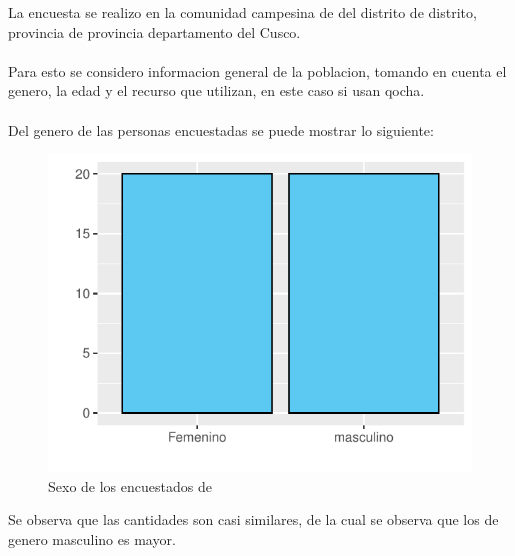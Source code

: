 \documentclass[12pt]{article}\usepackage[]{graphicx}\usepackage[]{xcolor}
\makeatletter
\def\maxwidth{ %
  \ifdim\Gin@nat@width>\linewidth
    \linewidth
  \else
    \Gin@nat@width
  \fi
}
\newenvironment{knitrout}{}{} %
\makeatother
\begin{document}

\tableofcontents
\newpage
\listoftables
\newpage
\listoffigures
\newpage
	La encuesta se realizo en la comunidad campesina de \comunidad\- del distrito de distrito, provincia de provincia departamento del Cusco.\\
	\\
	Para esto se considero informacion general de la poblacion, tomando en cuenta el genero, la edad y el recurso que utilizan, en este caso si usan qocha.\\
	\\
	Del genero de las personas encuestadas se puede mostrar lo siguiente:
	\begin{figure}[H]
	\centering
\begin{knitrout}
\color{fgcolor}
\includegraphics[width=\maxwidth]{figure/uno-1} 
\end{knitrout}
	\caption{Sexo de los encuestados de \comunidad}
	\end{figure}
	Se observa que las cantidades son casi similares, de la cual se observa que los de genero masculino es mayor.
\end{document}
